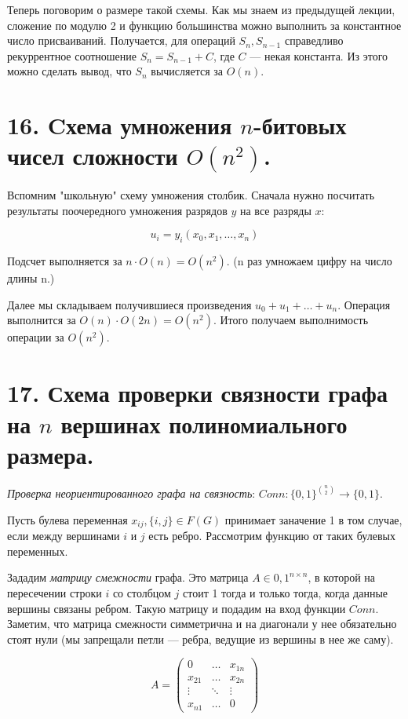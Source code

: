 \documentclass[a4paper, 12pt]{article}
\begin{document}
Теперь поговорим о размере такой схемы. Как мы знаем из предыдущей лекции, сложение по модулю 2 и функцию большинства можно выполнить за константное число присваиваний. Получается, для операций $S_n, S_{n-1}$ справедливо рекуррентное соотношение $S_n = S_{n-1} + C$, где $C$ --- некая константа. Из этого можно сделать вывод, что $S_n$ вычисляется за $O(n)$.

\section*{16. Cхема умножения $n$-битовых чисел сложности $O(n^2)$.}

Вспомним "школьную" схему умножения столбик. Сначала нужно посчитать результаты поочередного умножения разрядов $y$ на все разряды $x$: 

\[u_i = y_i(x_0, x_1, \ldots, x_n)\]

Подсчет выполняется за $n \cdot O(n) = O(n^2)$. (n раз умножаем цифру на число длины n.)

Далее мы складываем получившиеся произведения $u_0 + u_1 + \ldots + u_n$. Операция выполнится за $O(n) \cdot O(2n) = O(n^2)$. Итого получаем выполнимость операции за $O(n^2)$.

\section*{17. Схема проверки связности графа на $n$ вершинах полиномиального размера.}

\textit{Проверка неориентированного графа на связность}: $Conn: \{0,1\}^{n \choose 2} \rightarrow \{0,1\}$.

Пусть булева переменная $x_{ij}, \{i,j\} \in F(G)$ принимает заначение 1 в том случае, если между вершинами $i$ и $j$ есть ребро. Рассмотрим функцию от таких булевых переменных.

Зададим \textit{матрицу смежности} графа. Это матрица $A \in {0, 1}^{n \times n}$, в которой на пересечении строки $i$ со столбцом $j$ стоит 1 тогда и только тогда, когда данные вершины связаны ребром. Такую матрицу и подадим на вход функции $Conn$. Заметим, что матрица смежности симметрична и на диагонали у нее обязательно стоят нули (мы запрещали петли --- ребра, ведущие из вершины в нее же саму).

\[A = \begin{pmatrix} 0 & \ldots & x_{1n} \\ x_{21} & \ldots & x_{2n} \\ \vdots & \ddots & \vdots \\ x_{n1} & \ldots & 0 \end{pmatrix}\]  
\end{document}
